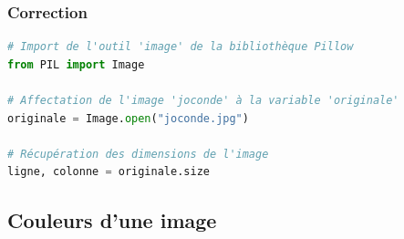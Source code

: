 \documentclass[svgnames,11pt]{beamer}
\begin{document}
\begin{frame}[fragile]
    \frametitle{Correction}

    \begin{center}
        \begin{lstlisting}[language=Python , basicstyle=\ttfamily\small, xleftmargin=2em, xrightmargin=2em]
# Import de l'outil 'image' de la bibliothèque Pillow
from PIL import Image

# Affectation de l'image 'joconde' à la variable 'originale'
originale = Image.open("joconde.jpg")

# Récupération des dimensions de l'image
ligne, colonne = originale.size
\end{lstlisting}
    \end{center}

\end{frame}
\subsection{Couleurs d'une image}
\end{document}
